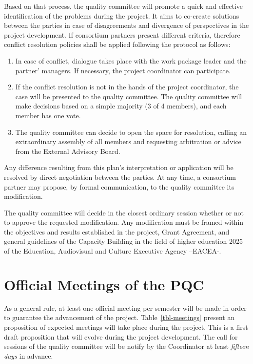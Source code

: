 \documentclass[
  12pt,
  oneside]{book}
\providecommand{\tightlist}{%
  \setlength{\itemsep}{0pt}\setlength{\parskip}{0pt}}\usepackage{longtable,booktabs,array}
\begin{document}
Based on that process, the quality committee will promote a quick and
effective identification of the problems during the project. It aims to
co-create solutions between the parties in case of disagreements and
divergence of perspectives in the project development. If consortium
partners present different criteria, therefore conflict resolution
policies shall be applied following the protocol as follows:

\begin{enumerate}
\def\labelenumi{\arabic{enumi}.}
\tightlist
\item
  In case of conflict, dialogue takes place with the work package leader
  and the partner' managers. If necessary, the project coordinator can
  participate.
\item
  If the conflict resolution is not in the hands of the project
  coordinator, the case will be presented to the quality committee. The
  quality committee will make decisions based on a simple majority (3 of
  4 members), and each member has one vote.
\item
  The quality committee can decide to open the space for resolution,
  calling an extraordinary assembly of all members and requesting
  arbitration or advice from the External Advisory Board.
\end{enumerate}

Any difference resulting from this plan's interpretation or application
will be resolved by direct negotiation between the parties. At any time,
a consortium partner may propose, by formal communication, to the
quality committee its modification.

The quality committee will decide in the closest ordinary session
whether or not to approve the requested modification. Any modification
must be framed within the objectives and results established in the
project, Grant Agreement, and general guidelines of the Capacity
Building in the field of higher education 2025 of the Education,
Audiovisual and Culture Executive Agency --EACEA-.

\section{Official Meetings of the
PQC}\label{official-meetings-of-the-pqc}

As a general rule, at least one official meeting per semester will be
made in order to guarantee the advancement of the project.
Table~\ref{tbl-meetings} present an proposition of expected meetings
will take place during the project. This is a first draft proposition
that will evolve during the project development. The call for sessions
of the quality committee will be notify by the Coordinator at least
\emph{fifteen days} in advance.
\end{document}
